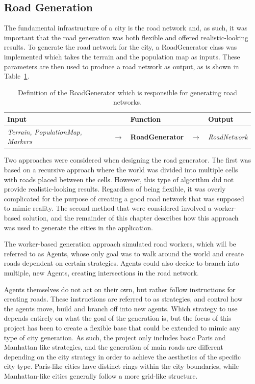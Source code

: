 \subsection{Road Generation}
The fundamental infrastructure of a city is the road network and, as such, it was important that the road generation was both flexible and offered realistic-looking results.
To generate the road network for the city, a RoadGenerator class was implemented which takes the terrain and the population map as inputs.
These parameters are then used to produce a road network as output, as is shown in Table~\ref{table:def_roadgen}.

\begin{table}[H]
  \centering
  \begin{tabular}{lllll}
    \textbf{Input} & & \textbf{Function} & & \textbf{Output} \\
    \midrule
    \textit{Terrain, PopulationMap, Markers} & $\rightarrow$ & \textbf{RoadGenerator}       & $\rightarrow$ & \textit{RoadNetwork}    \\
    \bottomrule
  \end{tabular}

  \caption{Definition of the RoadGenerator which is responsible for generating road networks.}
  \label{table:def_roadgen}
\end{table}
\vspace{-0.4cm}

Two approaches were considered when designing the road generator.
The first was based on a recursive approach where the world was divided into multiple cells with roads placed between the cells.
However, this type of algorithm did not provide realistic-looking results. Regardless of being flexible, it was overly complicated for the purpose of creating a good road network that was supposed to mimic reality.
The second method that were considered involved a worker-based solution, and the remainder of this chapter describes how this approach was used to generate the cities in the application.

The worker-based generation approach simulated road workers, which will be referred to as Agents, whose only goal was to walk around the world and create roads dependent on certain strategies.
Agents could also decide to branch into multiple, new Agents, creating intersections in the road network.

Agents themselves do not act on their own, but rather follow instructions for creating roads. These instructions are referred to as strategies, and control how the agents move, build and branch off into new agents.
Which strategy to use depends entirely on what the goal of the generation is, but the focus of this project has been to create a flexible base that could be extended to mimic any type of city generation.
As such, the project only includes basic Paris and Manhattan like strategies, and the generation of main roads are different depending on the city strategy in order to achieve the aesthetics of the specific city type.
Paris-like cities have distinct rings within the city boundaries, while Manhattan-like cities generally follow a more grid-like structure.

